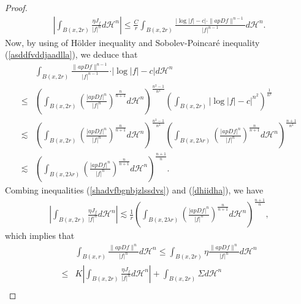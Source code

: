 \documentclass[11pt,twoside]{article}
\theoremstyle{definition}
\theoremstyle{remark}
\newcommand{\abs}[1]{\left|#1\right|}
\newcommand{\aleq}{\lesssim}
\begin{document}
\begin{proof}
\begin{equation}\label{shadvfbgnbjzlssdvs}
\begin{aligned}
\abs{\int_{B(x,2r)}\frac{\eta J_{f}}{\vert f\vert^{n}}d\mathcal{H}^{n}}
\leq\frac{C}{r}\int_{B(x,2r)}\frac{\vert\log\vert f\vert-c\vert\cdot\|apDf\|^{n-1}}{\vert f\vert^{n-1}}d\mathcal{H}^{n}.
\end{aligned}
\end{equation}
Now, by using of H\"{o}lder inequality and Sobolev-Poincar\'{e} inequality (\ref{asddfvddjaadlla}), we deduce that 
\begin{equation}\label{dhiidha}
\begin{aligned}
&\int_{B(x,2r)}\frac{\|apDf\|^{n-1}}{\vert f\vert^{n-1}}\cdot \vert\log\vert f\vert-c\vert d\mathcal{H}^{n}\\
\leq&\left(\int_{B(x,2r)}\left(\frac{\vert apDf\vert^{n}}{\vert f\vert^{n}}\right)^{\frac{n}{n+1}}d\mathcal{H}^{n}\right)^{\frac{n^{2}-1}{n^{2}}}
\left(\int_{B(x,2r)}\vert\log\vert f\vert-c\vert^{n^{2}}\right)^{\frac{1}{n^{2}}}\\
\aleq&\left(\int_{B(x,2r)}\left(\frac{\vert apDf\vert^{n}}{\vert f\vert^{n}}\right)^{\frac{n}{n+1}}d\mathcal{H}^{n}\right)^{\frac{n^{2}-1}{n^{2}}}\left(\int_{B(x,2\lambda r)}\left(\frac{\vert apDf\vert^{n}}{\vert f\vert^{n}}\right)^{\frac{n}{n+1}}d\mathcal{H}^{n}\right)^{\frac{n+1}{n^{2}}}\\
\aleq&\left(\int_{B(x,2\lambda r)}\left(\frac{\vert apDf\vert^{n}}{\vert f\vert^{n}}\right)^{\frac{n}{n+1}}d\mathcal{H}^{n}\right)^{\frac{n+1}{n}}.
\end{aligned}
\end{equation}
Combing inequalities (\ref{shadvfbgnbjzlssdvs}) and (\ref{dhiidha}), we have
\begin{equation}\label{1}
\begin{aligned}
\abs{\int_{B(x,2r)}\frac{\eta J_{f}}{\vert f\vert^{n}}d\mathcal{H}^{n}}
\aleq\frac{1}{r}\left(\int_{B(x,2\lambda r)}\left(\frac{\vert apDf\vert^{n}}{\vert f\vert^{n}}\right)^{\frac{n}{n+1}}d\mathcal{H}^{n}\right)^{\frac{n+1}{n}},
\end{aligned}
\end{equation}
which implies that 
\begin{equation}\label{123dhiidha}
\begin{aligned}
&\int_{B(x,r)}\frac{\|apDf\|^{n}}{\vert f\vert^{n}}d\mathcal{H}^{n}\leq\int_{B(x,2r)}\eta\frac{\|apDf\|^{n}}{\vert f\vert^{n}}d\mathcal{H}^{n}\\
\leq&K\abs{\int_{B(x,2r)}\frac{\eta J_{f}}{\vert f\vert^{n}}d\mathcal{H}^{n}}+\int_{B(x,2r)}\Sigma d\mathcal{H}^{n}\\

\end{aligned}
\end{equation}
\end{proof}
\end{document}
